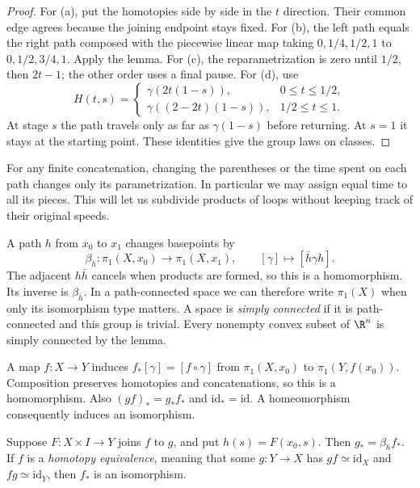 \begin{proof}
For (a), put the homotopies side by side in the $t$ direction. Their common edge agrees because the joining endpoint stays fixed. For (b), the left path equals the right path composed with the piecewise linear map taking $0,1/4,1/2,1$ to $0,1/2,3/4,1$. Apply the lemma. For (c), the reparametrization is zero until $1/2$, then $2t-1$; the other order uses a final pause. For (d), use
\[
H(t,s)=
\begin{cases}
\gamma(2t(1-s)),&0\le t\le1/2,\\
\gamma((2-2t)(1-s)),&1/2\le t\le1.
\end{cases}
\]
At stage $s$ the path travels only as far as $\gamma(1-s)$ before returning. At $s=1$ it stays at the starting point. These identities give the group laws on classes.
\end{proof}

For any finite concatenation, changing the parentheses or the time spent on each path changes only its parametrization. In particular we may assign equal time to all its pieces. This will let us subdivide products of loops without keeping track of their original speeds.

A path $h$ from $x_0$ to $x_1$ changes basepoints by
\[
\beta_h:\pi_1(X,x_0)\longrightarrow\pi_1(X,x_1),\qquad
[\gamma]\longmapsto[\bar h\gamma h].
\]
The adjacent $h\bar h$ cancels when products are formed, so this is a homomorphism. Its inverse is $\beta_{\bar h}$. In a path-connected space we can therefore write $\pi_1(X)$ when only its isomorphism type matters. A space is \emph{simply connected} if it is path-connected and this group is trivial. Every nonempty convex subset of $\R^n$ is simply connected by the lemma.

A map $f:X\to Y$ induces $f_*[\gamma]=[f\circ\gamma]$ from $\pi_1(X,x_0)$ to $\pi_1(Y,f(x_0))$. Composition preserves homotopies and concatenations, so this is a homomorphism. Also $(gf)_*=g_*f_*$ and $\mathrm{id}_*=\mathrm{id}$. A homeomorphism consequently induces an isomorphism.

\begin{proposition}\label{prop:homotopyinv}
Suppose $F:X\times I\to Y$ joins $f$ to $g$, and put $h(s)=F(x_0,s)$. Then $g_*=\beta_h f_*$. If $f$ is a \emph{homotopy equivalence}, meaning that some $g:Y\to X$ has $gf\simeq\mathrm{id}_X$ and $fg\simeq\mathrm{id}_Y$, then $f_*$ is an isomorphism.
\end{proposition}

